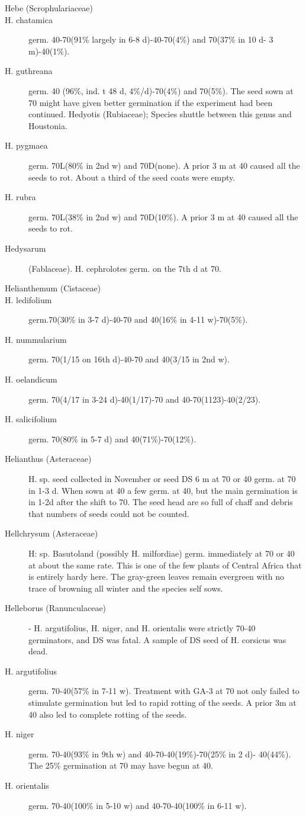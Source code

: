 \begin{description}
\item[Hebe (Scrophulariaceae)]
\item[H. chatamica] germ. 40-70(91\% largely in 6-8 d)-40-70(4\%) and 70(37\% in 10 d-
3 m)-40(1\%).
\item[H. guthreana] germ. 40 (96\%, ind. t 48 d, 4\%/d)-70(4\%) and 70(5\%). The seed
sown at 70 might have given better germination if the experiment had been continued.
Hedyotis (Rubiaceae); Species shuttle between this genus and Houstonia.
\item[H. pygmaea] germ. 70L(80\% in 2nd w) and 70D(none). A prior 3 m at 40
caused all the seeds to rot. About a third of the seed coats were empty.
\item[H. rubra] germ. 70L(38\% in 2nd w) and 70D(10\%). A prior 3 m at 40 caused all
the seeds to rot.

\item[Hedysarum] (Fablaceae). H. cephrolotes germ. on the 7th d at 70.
\item[Helianthemum (Cistaceae)]
\item[H. ledifolium] germ.70(30\% in 3-7 d)-40-70 and 40(16\% in 4-11 w)-70(5\%).
\item[H. nummularium] germ. 70(1/15 on 16th d)-40-70 and 40(3/15 in 2nd w).
\item[H. oelandicum] germ. 70(4/17 in 3-24 d)-40(1/17)-70 and 40-70(1123)-40(2/23).
\item[H. salicifolium] germ. 70(80\% in 5-7 d) and 40(71\%)-70(12\%).

\item[Helianthus (Asteraceae)] H. sp. seed collected in November or seed DS 6
m at 70 or 40 germ. at 70 in 1-3 d. When sown at 40 a few germ. at 40, but the main
germination is in 1-2d after the shift to 70. The seed head are so full of chaff and
debris that numbers of seeds could not be counted.
\item[Hellchrysum (Asteraceae)] H: sp. Basutoland (possibly H. milfordiae) germ.
immediately at 70 or 40 at about the same rate. This is one of the few plants of Central
Africa that is entirely hardy here. The gray-green leaves remain evergreen with no
trace of browning all winter and the species self sows.

\item[Helleborus (Ranunculaceae)]- H. argutifolius, H. niger, and H. orientalis
were strictly 70-40 germinators, and DS was fatal. A sample of DS seed of H. corsicus
was dead.
\item[H. argutifolius] germ. 70-40(57\% in 7-11 w). Treatment with GA-3 at 70 not only
failed to stimulate germination but led to rapid rotting of the seeds. A prior 3m at 40
also led to complete rotting of the seeds.
\item[H. niger] germ. 70-40(93\% in 9th w) and 40-70-40(19\%)-70(25\% in 2 d)-
40(44\%). The 25\% germination at 70 may have begun at 40.
\item[H. orientalis] germ. 70-40(100\% in 5-10 w) and 40-70-40(100\% in 6-11 w).


\end{description}
